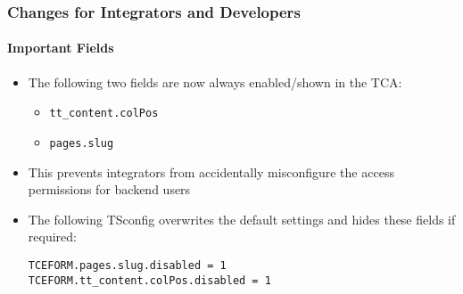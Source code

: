%

\begin{frame}[fragile]
	\frametitle{Changes for Integrators and Developers}
	\framesubtitle{Important Fields}


	\begin{itemize}
		\item The following two fields are now always enabled/shown in the TCA:
			\begin{itemize}
				\item \texttt{tt\_content.colPos}
				\item \texttt{pages.slug}
			\end{itemize}
		\item This prevents integrators from accidentally misconfigure the
			access permissions for backend users
		\item The following TSconfig overwrites the default settings and hides
			these fields if required:
\begin{lstlisting}
TCEFORM.pages.slug.disabled = 1
TCEFORM.tt_content.colPos.disabled = 1
\end{lstlisting}

	\end{itemize}

\end{frame}

